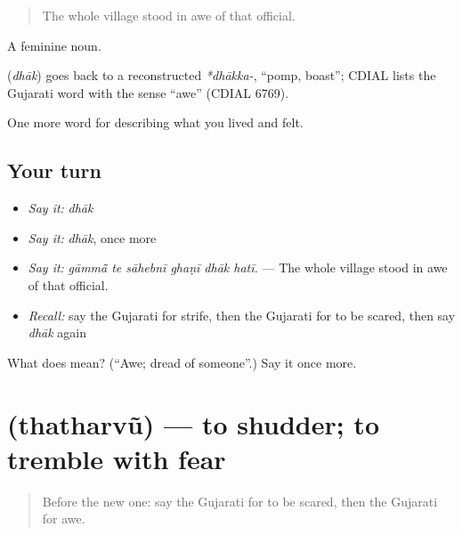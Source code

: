 \begin{quote}
The whole village stood in awe of that official.
\end{quote}

A feminine noun.

\begin{cousinweb}
\textbf{} (\emph{dhāk}) goes back to a reconstructed \emph{*dhākka-}, \textquotedblleft{}pomp, boast\textquotedblright{}; CDIAL lists the Gujarati word with the sense \textquotedblleft{}awe\textquotedblright{} (CDIAL 6769).
\end{cousinweb}

\begin{grammarlens}[title={What you've built}]
One more word for describing what you lived and felt.
\end{grammarlens}

\subsection*{Your turn}
\begin{itemize}
\raggedright
  \item \emph{Say it:} \emph{dhāk}
  \item \emph{Say it:} \emph{dhāk}, once more
  \item \emph{Say it:} \emph{gāmmā̃ te sāhebnī ghaṇī dhāk hatī.} — The whole village stood in awe of that official.
  \item \emph{Recall:} say the Gujarati for strife, then the Gujarati for to be scared, then say \emph{dhāk} again
\end{itemize}

\begin{tcolorbox}[breakable,colback=teal!4,colframe=teal!35!black,title={Before you move on}]
What does  mean? (\textquotedblleft{}Awe; dread of someone\textquotedblright{}.) Say it once more.
\end{tcolorbox}
\section[\texorpdfstring{\gu{થથરવું} (thatharvũ)}{થથરવું (thatharvũ)}]{ (thatharvũ) — to shudder; to tremble with fear}

\label{lesson:GU-C453-thatharvu}



\begin{quote}
Before the new one: say the Gujarati for to be scared, then the Gujarati for awe.
\end{quote}

